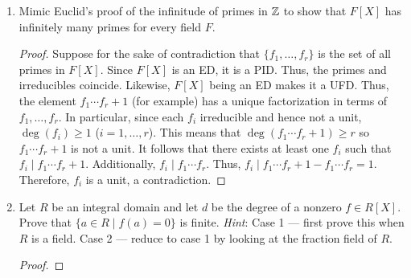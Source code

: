 \documentclass[../psets.tex]{subfiles}
\begin{document}
\begin{enumerate}
\begin{enumerate}[label={(\alph*)}]
\begin{proof}
        \end{proof}
    \end{enumerate}
    \item Mimic Euclid's proof of the infinitude of primes in $\mathbb{Z}$ to show that $F[X]$ has infinitely many primes for every field $F$.
    \begin{proof}
        
        Suppose for the sake of contradiction that $\{f_1,\dots,f_r\}$ is the set of all primes in $F[X]$. Since $F[X]$ is an ED, it is a PID. Thus, the primes and irreducibles coincide. Likewise, $F[X]$ being an ED makes it a UFD. Thus, the element $f_1\cdots f_r+1$ (for example) has a unique factorization in terms of $f_1,\dots,f_r$. In particular, since each $f_i$ irreducible and hence not a unit, $\deg(f_i)\geq 1$ ($i=1,\dots,r$). This means that $\deg(f_1\cdots f_r+1)\geq r$ so $f_1\cdots f_r+1$ is not a unit. It follows that there exists at least one $f_i$ such that $f_i\mid f_1\cdots f_r+1$. Additionally, $f_i\mid f_1\cdots f_r$. Thus, $f_i\mid f_1\cdots f_r+1-f_1\cdots f_r=1$. Therefore, $f_i$ is a unit, a contradiction.
    \end{proof}
    \item Let $R$ be an integral domain and let $d$ be the degree of a nonzero $f\in R[X]$. Prove that $\{a\in R\mid f(a)=0\}$ is finite. \emph{Hint}: Case 1 --- first prove this when $R$ is a field. Case 2 --- reduce to case 1 by looking at the fraction field of $R$.
    \begin{proof}


\end{proof}
\end{enumerate}
\end{document}

